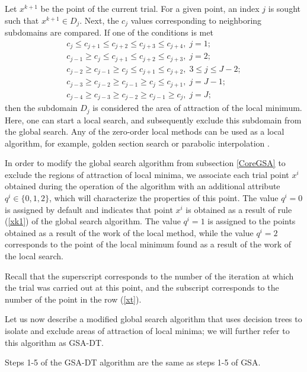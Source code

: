 \documentclass[entropy,article,submit,moreauthors,pdftex]{Definitions/mdpi}
\begin{document}
Let $x^{k+1}$ be the point of the current trial. For a given point, an index  $j$ is sought such that $x^{k+1} \in D_j$. 
Next, the  $c_j$ values corresponding to neighboring subdomains are compared. If one of the conditions is met
\begin{gather}
c_{j} \leq c_{j+1} \leq c_{j+2} \leq c_{j+3} \leq c_{j+4}, \; j=1; \nonumber \\ 
c_{j-1} \geq c_{j} \leq c_{j+1} \leq c_{j+2} \leq c_{j+3}, \; j=2;  \nonumber \\  
c_{j-2} \geq c_{j-1} \geq c_{j} \leq c_{j+1} \leq c_{j+2}, \; 3 \leq j \leq J-2; \label{LPC} \\ 
c_{j-3} \geq c_{j-2} \geq c_{j-1} \geq c_{j} \leq c_{j+1}, \; j=J-1; \nonumber \\ 
c_{j-4} \geq c_{j-3} \geq c_{j-2} \geq c_{j-1} \geq c_{j}, \; j=J; \nonumber 
\end{gather}
then the subdomain $D_j$ is considered the area of attraction of the local minimum. Here, one can start a local search, and subsequently exclude this subdomain from the global search. 
Any of the zero-order local methods can be used as a local algorithm, for example, golden section search or parabolic interpolation \cite{Press}.

In order to modify the global search algorithm from subsection  \ref{CoreGSA} to exclude the regions of attraction of local minima, we associate each trial point  $x^i$ obtained during the operation of the algorithm with an additional attribute $q^i \in \{0,1,2\}$, which will characterize the properties of this point. 
The value  $q^i=0$ is assigned by default and indicates that point $x^i$ is obtained as a result of rule (\ref{xk1}) of the global search algorithm.
The value $q^i=1$ is assigned to the points obtained as a result of the work of the local method, while the value  $q^i=2$ corresponds to the point of the local minimum found as a result of the work of the local search.

Recall that the superscript corresponds to the number of the iteration at which the trial was carried out at this point, and the subscript corresponds to the number of the point in the row  (\ref{xt}).

Let us now describe a modified global search algorithm that uses decision trees to isolate and exclude areas of attraction of local minima; we will further refer to this algorithm as GSA-DT.

Steps 1-5 of the GSA-DT algorithm are the same as steps 1-5 of GSA.
\end{document}
